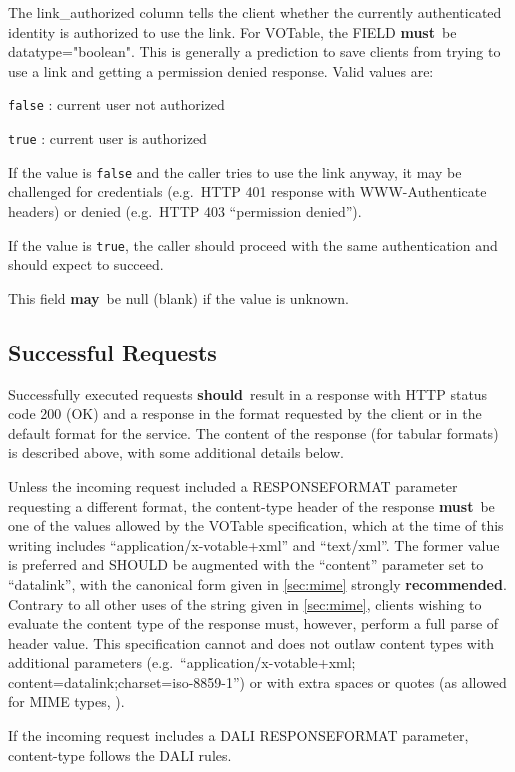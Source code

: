 \documentclass[11pt,a4paper]{ivoa}
\newcommand{\attval}[2]{#1={\allowbreak}{"}#2{"}}
\newcommand{\rfcmust}{\textbf{must}}
\newcommand{\rfcshould}{\textbf{should}}
\newcommand{\rfcmay}{\textbf{may}}
\newcommand{\rfcrecommended}{\textbf{recommended}}
\begin{document}
The link\_authorized column tells the client whether the currently authenticated 
identity is authorized to use the link. For VOTable, the FIELD \rfcmust\ be
\attval{datatype}{boolean}. This is generally a prediction to save 
clients from trying to use a link and getting a permission denied response. Valid 
values are:

\verb|false| : current user not authorized

\verb|true| : current user is authorized

If the value is \verb|false| and the caller tries to use the link anyway, it may be 
challenged for credentials (e.g.\ HTTP 401 response with WWW-Authenticate headers) or 
denied (e.g.\ HTTP 403 ``permission denied'').

If the value is \verb|true|, the caller should proceed with the same authentication
and should expect to succeed.

This field \rfcmay\ be null (blank) if the value is unknown.

\subsection{Successful Requests}
\label{sec:successfulRequests}

Successfully executed requests \rfcshould\ result in a response with HTTP
status code 200 (OK) and a response in the format requested by the client
or in the default format for the service. The content of the response
(for tabular formats) is described above,
with some additional details below.

Unless the incoming request included a RESPONSEFORMAT parameter requesting
a different format, the content-type header of the response \rfcmust\ be one of the 
values allowed by the VOTable specification, which at the time of this writing includes
``application/x-votable+xml'' and ``text/xml''. The former value is preferred
and SHOULD be augmented with the ``content'' parameter set to ``datalink'',
with the canonical form given in \ref{sec:mime}
strongly \rfcrecommended. Contrary to
all other uses of the string given in \ref{sec:mime},
clients wishing to evaluate
the content type of the response must, however, perform a full parse
of header value. This specification cannot and does not outlaw content
types with additional parameters
(e.g.\ ``application/x-votable+xml; content=datalink;charset=iso-8859-1'')
or with extra spaces or quotes
(as allowed for MIME types, \citet{std:RFC2045}).

If the incoming request includes a DALI RESPONSEFORMAT parameter,
content-type follows the DALI rules.
\end{document}
